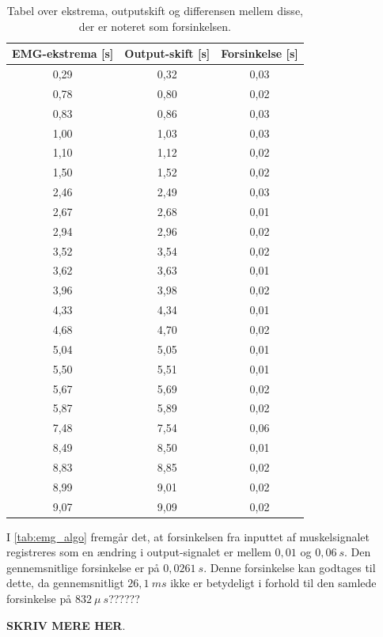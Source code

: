 \begin{table}[H]
\centering
\begin{tabular}{|c|c|c|}
\hline 
\textbf{EMG-ekstrema [s]} & \textbf{Output-skift [s]} & \textbf{Forsinkelse [s]}\\ 
\hline 
0,29 & 0,32 & 0,03\\ 
\hline 
0,78 & 0,80 & 0,02\\ 
\hline 
0,83 & 0,86 & 0,03\\ 
\hline 
1,00 & 1,03 & 0,03\\ 
\hline 
1,10 & 1,12 & 0,02\\ 
\hline 
1,50 & 1,52 & 0,02\\ 
\hline 
2,46 & 2,49 & 0,03\\ 
\hline 
2,67 & 2,68 & 0,01\\ 
\hline 
2,94 & 2,96 & 0,02\\ 
\hline 
3,52 & 3,54 & 0,02\\ 
\hline 
3,62 & 3,63 & 0,01\\ 
\hline 
3,96 & 3,98 & 0,02\\ 
\hline 
4,33 & 4,34 & 0,01\\ 
\hline 
4,68 & 4,70 & 0,02\\ 
\hline 
5,04 & 5,05 & 0,01\\ 
\hline 
5,50 & 5,51 & 0,01\\ 
\hline 
5,67 & 5,69 & 0,02\\ 
\hline 
5,87 & 5,89 & 0,02\\ 
\hline 
7,48 & 7,54 & 0,06\\ 
\hline 
8,49 & 8,50 & 0,01\\ 
\hline 
8,83 & 8,85 & 0,02\\ 
\hline 
8,99 & 9,01 & 0,02\\ 
\hline 
9,07 & 9,09 & 0,02\\ 
\hline 
\end{tabular} 
\caption{Tabel over ekstrema, outputskift og differensen mellem disse, der er noteret som forsinkelsen.}
\label{tab:emg_algo}
\end{table}

\noindent
I \autoref{tab:emg_algo} fremgår det, at forsinkelsen fra inputtet af muskelsignalet registreres som en ændring i output-signalet er mellem $0,01$ og $0,06~s$. Den gennemsnitlige forsinkelse er på $0,0261~s$. Denne forsinkelse kan godtages til dette, da gennemsnitligt $26,1~ms$ ikke er betydeligt i forhold til den samlede forsinkelse på $832~\mu~s$??????



 \textbf{SKRIV MERE HER}.